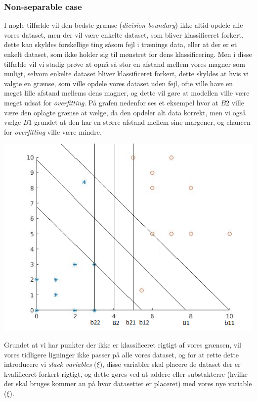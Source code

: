 \documentclass{article}
\begin{document}
\subsubsection{Non-separable case}
I nogle tilfælde vil den bedste grænse (\textit{dicision boundary}) ikke altid opdele alle vores dataset, men der vil være enkelte dataset, som bliver klassificeret forkert, dette kan skyldes forskellige ting såsom fejl i trænings data, eller at der er et enkelt dataset, som ikke holder sig til mønstret for dens klassificering. Men i disse tilfælde vil vi stadig prøve at opnå så stor en afstand mellem vores magner som muligt, selvom enkelte dataset bliver klassificeret forkert, dette skyldes at hvis vi valgte en grænse, som ville opdele vores dataset uden fejl, ofte ville have en meget lille afstand mellems dens magner, og dette vil gøre at modellen ville være meget udsat for \textit{overfitting}. På grafen nedenfor ses et eksempel hvor at $B2$ ville være den oplagte grænse at vælge, da den opdeler alt data korrekt, men vi også vælge $B1$ grundet at den har en større afstand mellem sine margener, og chancen for \textit{overfitting} ville være mindre. 
\begin{center}
	\includegraphics{svm_plot_1}
\end{center}
Grundet at vi har punkter der ikke er klassificeret rigtigt af vores grænsen, vil vores tidligere ligninger ikke passer på alle vores dataset, og for at rette dette introducere vi \textit{slack variables} ($\xi$), disse variabler skal placere de dataset der er kvalificeret forkert rigtigt, og dette gøres ved at addere eller substakterre (hvilke der skal bruges kommer an på hvor datasettet er placeret) med vores nye variable ($\xi$). 
\end{document}
